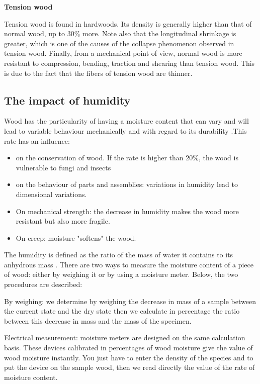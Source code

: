 \smallskip

\textbf{Tension wood}

Tension wood is found in hardwoods. Its density is generally higher than that of normal wood, up to $30 \%$ more. Note also that the longitudinal shrinkage is greater, which is one of the causes of the collapse phenomenon observed in tension wood. Finally, from a mechanical point of view, normal wood is more resistant to compression, bending, traction and shearing than tension wood. This is due to the fact that the fibers of tension wood are thinner.

\subsection{The impact of humidity}

Wood has the particularity of having a moisture content that can vary and will lead to variable behaviour mechanically and with regard to its durability \cite{Taazount2021}.This rate has an influence: 

\begin{itemize}
	\item on the conservation of wood. If the rate is higher than $20 \%$, the wood is vulnerable to fungi and insects
	\item on the behaviour of parts and assemblies: variations in humidity lead to dimensional variations.
	\item On mechanical strength: the decrease in humidity makes the wood more resistant but also more fragile.
	\item On creep: moisture "softens" the wood.
\end{itemize}

The humidity is defined as the ratio of the mass of water it contains to its anhydrous mass \cite{Nguyen2016phd}. There are two ways to measure the moisture content of a piece of wood: either by weighing it or by using a moisture meter. Below, the two procedures are described:

By weighing: we determine by weighing the decrease in mass of a sample between the current state and the dry state then we calculate in percentage the ratio between this decrease in mass and the mass of the specimen.

Electrical measurement: moisture meters are designed on the same calculation basis. These devices calibrated in percentages of wood moisture give the value of wood moisture instantly. You just have to enter the density of the species and to put the device on the sample wood, then we read directly the value of the rate of moisture content.

